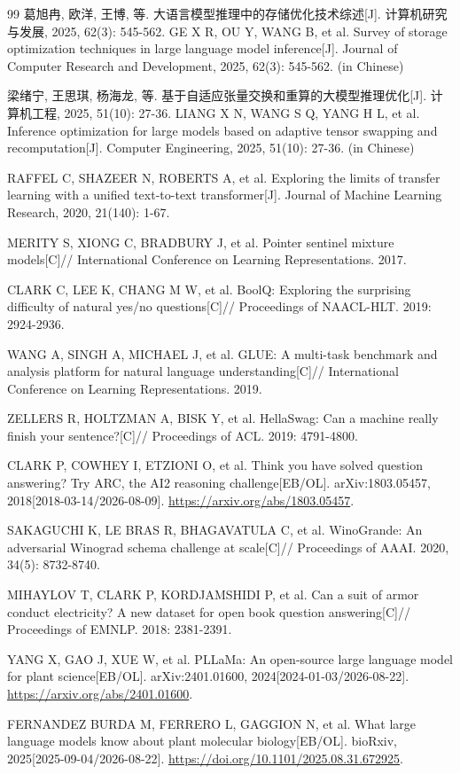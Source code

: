 \begin{thebibliography}{99}
葛旭冉, 欧洋, 王博, 等.
大语言模型推理中的存储优化技术综述[J].
计算机研究与发展, 2025, 62(3): 545-562.
GE X R, OU Y, WANG B, et al. Survey of storage optimization techniques in large language model inference[J].
Journal of Computer Research and Development, 2025, 62(3): 545-562. (in Chinese)

梁绪宁, 王思琪, 杨海龙, 等.
基于自适应张量交换和重算的大模型推理优化[J].
计算机工程, 2025, 51(10): 27-36.
LIANG X N, WANG S Q, YANG H L, et al. Inference optimization for large models based on adaptive tensor swapping and recomputation[J].
Computer Engineering, 2025, 51(10): 27-36. (in Chinese)

RAFFEL C, SHAZEER N, ROBERTS A, et al.
Exploring the limits of transfer learning with a unified text-to-text transformer[J].
Journal of Machine Learning Research, 2020, 21(140): 1-67.

MERITY S, XIONG C, BRADBURY J, et al.
Pointer sentinel mixture models[C]//
International Conference on Learning Representations.
2017.

CLARK C, LEE K, CHANG M W, et al.
BoolQ: Exploring the surprising difficulty of natural yes/no questions[C]//
Proceedings of NAACL-HLT.
2019: 2924-2936.

WANG A, SINGH A, MICHAEL J, et al.
GLUE: A multi-task benchmark and analysis platform for natural language understanding[C]//
International Conference on Learning Representations.
2019.

ZELLERS R, HOLTZMAN A, BISK Y, et al.
HellaSwag: Can a machine really finish your sentence?[C]//
Proceedings of ACL.
2019: 4791-4800.

CLARK P, COWHEY I, ETZIONI O, et al.
Think you have solved question answering? Try ARC, the AI2 reasoning challenge[EB/OL].
arXiv:1803.05457, 2018[2018-03-14/2026-08-09].
\url{https://arxiv.org/abs/1803.05457}.

SAKAGUCHI K, LE BRAS R, BHAGAVATULA C, et al.
WinoGrande: An adversarial Winograd schema challenge at scale[C]//
Proceedings of AAAI.
2020, 34(5): 8732-8740.

MIHAYLOV T, CLARK P, KORDJAMSHIDI P, et al.
Can a suit of armor conduct electricity? A new dataset for open book question answering[C]//
Proceedings of EMNLP.
2018: 2381-2391.

YANG X, GAO J, XUE W, et al.
PLLaMa: An open-source large language model for plant science[EB/OL].
arXiv:2401.01600, 2024[2024-01-03/2026-08-22].
\url{https://arxiv.org/abs/2401.01600}.

FERNANDEZ BURDA M, FERRERO L, GAGGION N, et al.
What large language models know about plant molecular biology[EB/OL].
bioRxiv, 2025[2025-09-04/2026-08-22].
\url{https://doi.org/10.1101/2025.08.31.672925}.

\end{thebibliography}
